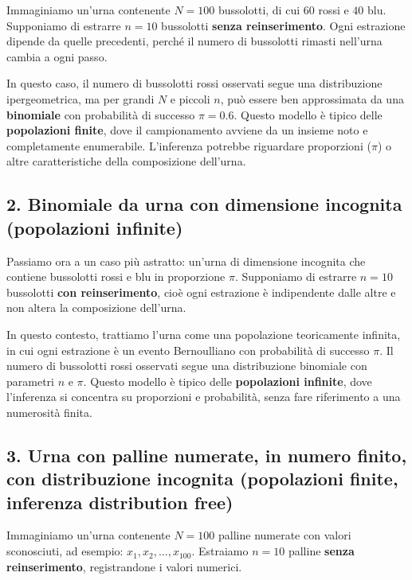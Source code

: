 \documentclass[
  11pt,
]{book}
\theoremstyle{mytheoremstyle}
\theoremstyle{mydefstyle}
\begin{document}
Immaginiamo un'urna contenente \(N = 100\) bussolotti, di cui \(60\) rossi e \(40\) blu. Supponiamo di estrarre \(n = 10\) bussolotti \textbf{senza reinserimento}. Ogni estrazione dipende da quelle precedenti, perché il numero di bussolotti rimasti nell'urna cambia a ogni passo.

In questo caso, il numero di bussolotti rossi osservati segue una distribuzione ipergeometrica, ma per grandi \(N\) e piccoli \(n\), può essere ben approssimata da una \textbf{binomiale} con probabilità di successo \(\pi = 0.6\). Questo modello è tipico delle \textbf{popolazioni finite}, dove il campionamento avviene da un insieme noto e completamente enumerabile. L'inferenza potrebbe riguardare proporzioni (\(\pi\)) o altre caratteristiche della composizione dell'urna.

\subsection{2. Binomiale da urna con dimensione incognita (popolazioni infinite)}\label{binomiale-da-urna-con-dimensione-incognita-popolazioni-infinite}

Passiamo ora a un caso più astratto: un'urna di dimensione incognita che contiene bussolotti rossi e blu in proporzione \(\pi\). Supponiamo di estrarre \(n = 10\) bussolotti \textbf{con reinserimento}, cioè ogni estrazione è indipendente dalle altre e non altera la composizione dell'urna.

In questo contesto, trattiamo l'urna come una popolazione teoricamente infinita, in cui ogni estrazione è un evento Bernoulliano con probabilità di successo \(\pi\). Il numero di bussolotti rossi osservati segue una distribuzione binomiale con parametri \(n\) e \(\pi\). Questo modello è tipico delle \textbf{popolazioni infinite}, dove l'inferenza si concentra su proporzioni e probabilità, senza fare riferimento a una numerosità finita.

\subsection{3. Urna con palline numerate, in numero finito, con distribuzione incognita (popolazioni finite, inferenza distribution free)}\label{urna-con-palline-numerate-in-numero-finito-con-distribuzione-incognita-popolazioni-finite-inferenza-distribution-free}

Immaginiamo un'urna contenente \(N = 100\) palline numerate con valori sconosciuti, ad esempio: \(x_1, x_2, \dots, x_{100}\). Estraiamo \(n = 10\) palline \textbf{senza reinserimento}, registrandone i valori numerici.
\end{document}
